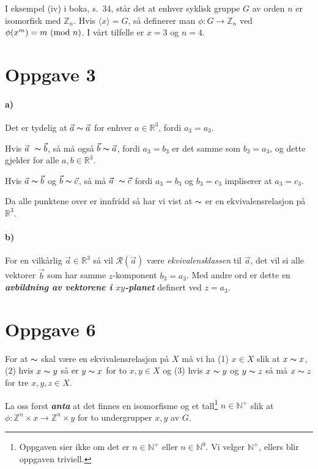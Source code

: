 \documentclass[a4paper,norsk,twocolumn,10pt]{article}
\begin{document}
I eksempel (iv) i boka, s.~34, står det at enhver syklisk gruppe $G$ av orden
$n$ er isomorfisk med $\mathbb{Z}_n$. Hvis $\langle x \rangle = G$, så
definerer man $\phi\colon G \rightarrow \mathbb{Z}_n$ ved $\phi{(x^m)} = m
\ (\text{mod}\ n)$. I vårt tilfelle er $x=3$ og $n=4$.

\section*{Oppgave 3}
\paragraph{\textbf{a)}}
Det er tydelig at $\vec{a} \thicksim \vec{a}$ for enhver $a\in \mathbb{R}^3$,
fordi $a_3=a_3$.

Hvis $\vec{a} \thicksim \vec{b}$, så må også $\vec{b} \thicksim \vec{a}$, fordi
$a_3=b_3$ er det samme som $b_3=a_3$, og dette gjelder for alle $a,b \in
\mathbb{R}^3$.

Hvis $\vec{a} \thicksim \vec{b}$ og $\vec{b} \thicksim \vec{c}$, så må
$\vec{a} \thicksim \vec{c}$ fordi $a_3=b_3$ og $b_3=c_3$ impliserer at
$a_3=c_3$.

Da alle punktene over er innfridd så har vi vist at $\thicksim$ er en
ekvivalensrelasjon på $\mathbb{R}^3$.

\paragraph{\textbf{b)}}
For en vilkårlig $\vec{a} \in \mathbb{R}^3$ så vil $\mathscr{R}(\vec{a})$ være
\textit{ekvivalensklassen} til $\vec{a}$, det vil si alle vektorer $\vec{b}$
som har samme $z$-komponent $b_3=a_3$. Med andre ord er dette en
\textbf{\textit{avbildning av vektorene i $xy$-planet}}
definert ved $z=a_3$.

\section*{Oppgave 6}
For at $\thicksim$ skal være en ekvivalensrelasjon på $X$ må vi ha (1) $x\in X$
slik at $x \thicksim x$, (2) hvis $x \thicksim y$ så er $y \thicksim x$ for to
$x,y \in X$ og (3) hvis $x \thicksim y$ og $y \thicksim z$ så må $x \thicksim
z$ for tre $x,y,z \in X$.

La oss først \textbf{\textit{anta}} at det finnes en isomorfisme og et
tall\footnote{Oppgaven sier ikke om det er $n \in \mathbb{N}^+$ eller $n \in
\mathbb{N}^0$. Vi velger $\mathbb{N}^+$, ellers blir oppgaven triviell.} $n \in
\mathbb{N}^+$ slik at $\phi\colon \mathbb{Z}^n \times x \rightarrow
\mathbb{Z}^n \times y$ for to undergrupper $x,y$ av $G$.
\end{document}
